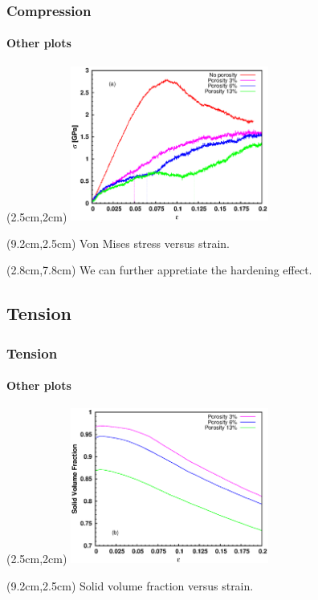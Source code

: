 \documentclass[12pt,t]{beamer}
\begin{document}
\begin{frame}
\frametitle{Compression}
\framesubtitle{Other plots}
  \begin{textblock*}{6.5cm}(2.5cm,2cm) %
  \includegraphics[width=6.5cm]{stress_strain_comp_dash.eps}
  \end{textblock*}
\begin{textblock*}{3cm}(9.2cm,2.5cm) %
  Von Mises stress versus strain.
\end{textblock*}
\begin{textblock*}{9cm}(2.8cm,7.8cm) %
  We can further appretiate the hardening effect.
\end{textblock*}
\end{frame}


\subsection{Tension}

\begin{frame}
\frametitle{Tension}
\framesubtitle{Other plots}
  \begin{textblock*}{6.5cm}(2.5cm,2cm) %
  \includegraphics[width=6.5cm]{SVF_strain_tens.eps}
  \end{textblock*}
\begin{textblock*}{3cm}(9.2cm,2.5cm) %
  Solid volume fraction versus strain.
\end{textblock*}
\end{frame}
\end{document}

